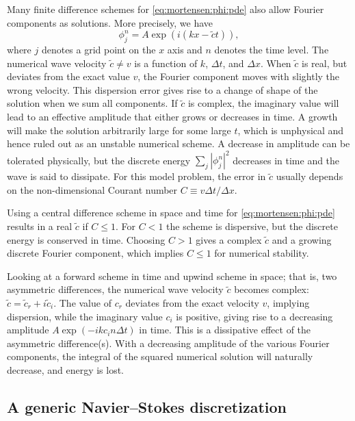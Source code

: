 Many finite difference schemes for \eqref{eq:mortensen:phi:pde} also
allow Fourier components as solutions. More precisely, we have
\begin{equation}
   \phi_j^n = A\exp{(i(kx - \tilde c t))},
\end{equation}
where $j$ denotes a grid point on the $x$ axis and $n$ denotes the time
level.  The numerical wave velocity $\tilde c \neq v$ is a function of
$k$, $\Delta t$, and $\Delta x$.  When $\tilde c$ is real, but deviates
from the exact value $v$, the Fourier component moves with slightly the
wrong velocity. This dispersion error gives rise to a change of shape
of the solution when we sum all components.  If $\tilde c$ is complex,
the imaginary value will lead to an effective amplitude that either
grows or decreases in time. A growth will make the solution arbitrarily
large for some large $t$, which is unphysical and hence ruled out as an
unstable numerical scheme.  A decrease in amplitude can be tolerated
physically, but the discrete energy $\sum_j |\phi_j^n|^2$ decreases
in time and the wave is said to dissipate.  For this model problem,
the error in $\tilde c$ usually depends on the non-dimensional Courant
number $C\equiv v\Delta t/\Delta x$.

Using a central difference scheme in space and time for
\eqref{eq:mortensen:phi:pde} results in a real $\tilde c$ if $C\leqslant
1$. For $C<1$ the scheme is dispersive, but the discrete energy is
conserved in time.  Choosing $C>1$ gives a complex $\tilde c$ and a
growing discrete Fourier component, which implies $C\leqslant1$ for
numerical stability.

Looking at a forward scheme in time and upwind scheme in space; that
is, two asymmetric differences, the numerical wave velocity $\tilde c$
becomes complex: $\tilde c = \tilde c_r + i\tilde c_i$.  The value
of $c_r$ deviates from the exact velocity $v$, implying dispersion,
while the imaginary value $c_i$ is positive, giving rise to a decreasing
amplitude $A\exp{(-ikc_i n\Delta t)}$ in time.  This is a dissipative
effect of the asymmetric difference(s).  With a decreasing amplitude of
the various Fourier components, the integral of the squared numerical
solution will naturally decrease, and energy is lost.

\subsection{A generic Navier--Stokes discretization}
\label{sec:mortensen:NS-solver}

